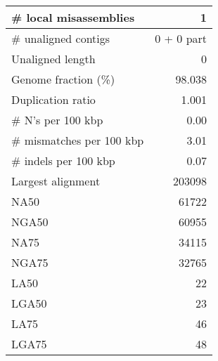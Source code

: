\documentclass[12pt,a4paper]{article}
\begin{document}
\begin{table}[ht]
\begin{center}
\begin{tabular}{|l*{1}{|r}|}
\# local misassemblies & 1 \\ \hline
\# unaligned contigs & 0 + 0 part \\ \hline
Unaligned length & 0 \\ \hline
Genome fraction (\%) & 98.038 \\ \hline
Duplication ratio & 1.001 \\ \hline
\# N's per 100 kbp & 0.00 \\ \hline
\# mismatches per 100 kbp & 3.01 \\ \hline
\# indels per 100 kbp & 0.07 \\ \hline
Largest alignment & 203098 \\ \hline
NA50 & 61722 \\ \hline
NGA50 & 60955 \\ \hline
NA75 & 34115 \\ \hline
NGA75 & 32765 \\ \hline
LA50 & 22 \\ \hline
LGA50 & 23 \\ \hline
LA75 & 46 \\ \hline
LGA75 & 48 \\ \hline
\end{tabular}
\end{center}
\end{table}
\end{document}
